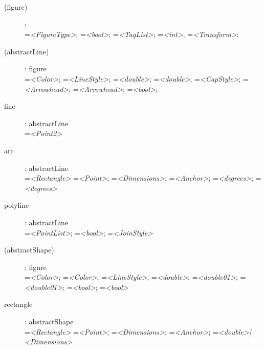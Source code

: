 \begin{flushleft}
\begin{description}

\item[(figure)]: \\
    =\textit{<FigureType>};
    =\textit{<bool>};
    =\textit{<TagList>};
    =\textit{<int>};
    =\textit{<Transform>};

\item[(abstractLine)]: figure \\
    =\textit{<Color>};
    =\textit{<LineStyle>};
    =\textit{<double>};
    =\textit{<double>};
    =\textit{<CapStyle>};
    =\textit{<Arrowhead>};
    =\textit{<Arrowhead>};
    =\textit{<bool>};

\item[line]: abstractLine \\
    =\textit{<Point2>}

\item[arc]: abstractLine \\
    =\textit{<Rectangle>}
    =\textit{<Point>};
    =\textit{<Dimensions>};
    =\textit{<Anchor>};
    =\textit{<degrees>};
    =\textit{<degrees>}

\item[polyline]: abstractLine \\
    =\textit{<PointList>};
    =\textit{<bool>};
    =\textit{<JoinStyle>}

\item[(abstractShape)]: figure \\
    =\textit{<Color>};
    =\textit{<Color>};
    =\textit{<LineStyle>};
    =\textit{<double>};
    =\textit{<double01>};
    =\textit{<double01>};
    =\textit{<bool>};
    =\textit{<bool>}

\item[rectangle]: abstractShape \\
    =\textit{<Rectangle>}
    =\textit{<Point>};
    =\textit{<Dimensions>};
    =\textit{<Anchor>};
    =\textit{<double>|<Dimensions>}


\end{description}
\end{flushleft}
